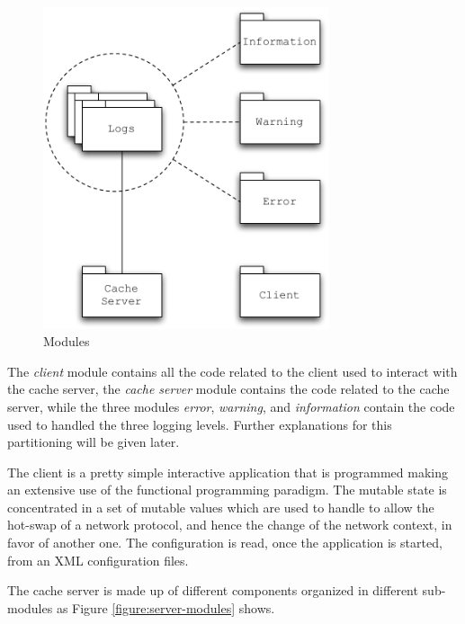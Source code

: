 \documentclass[11pt,a4paper]{article}
\begin{document}
\begin{figure}
\begin{center}
\includegraphics[width=0.75\textwidth]{figures/Modules.pdf}
\caption{Modules}
\label{figure:modules}
\end{center}
\end{figure}

The \textit{client} module contains all the code related to the client used to interact with the cache server, the \textit{cache server} module contains the code related to the cache server, while the three modules \textit{error}, \textit{warning}, and \textit{information} contain the code used to handled the three logging levels. Further explanations for this partitioning will be given later.

The client is a pretty simple interactive application that is programmed making an extensive use of the functional programming paradigm. The mutable state is concentrated in a set of mutable values which are used to handle to allow the hot-swap of a network protocol, and hence the change of the network context, in favor of another one. The configuration is read, once the application is started, from an XML configuration files.

The cache server is made up of different components organized in different sub-modules as Figure \ref{figure:server-modules} shows.
\end{document}
